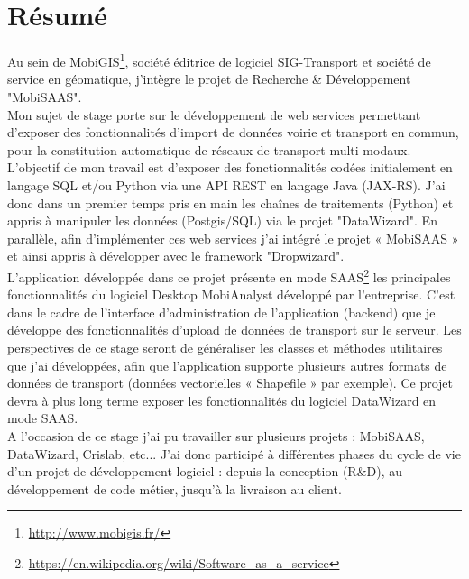 \documentclass[12pt,openany]{StyleBertrand}
\author{Bertrand Guerrero}
\begin{document}
\chapter*{Résumé}\label{Resume}

Au sein de MobiGIS\footnote{\url{http://www.mobigis.fr/}}, société éditrice de logiciel SIG-Transport et société de service en géomatique, j'intègre le projet de Recherche \& Développement "MobiSAAS".\\

Mon sujet de stage porte sur le développement de web services permettant d'exposer des fonctionnalités d'import de données voirie et transport en commun, pour la constitution automatique de réseaux de transport multi-modaux. \\

L'objectif de mon travail est d'exposer des fonctionnalités codées initialement en langage SQL et/ou Python via une API REST en langage Java (JAX-RS). J'ai donc dans un premier temps pris en main les chaînes de traitements (Python) et appris à manipuler les données (Postgis/SQL) via le projet "DataWizard". En parallèle, afin d'implémenter ces web services j'ai intégré le projet « MobiSAAS » et ainsi appris à développer avec le framework "Dropwizard". \\

L'application développée dans ce projet présente en mode SAAS\footnote{\url{https://en.wikipedia.org/wiki/Software_as_a_service}} les principales fonctionnalités du logiciel Desktop MobiAnalyst développé par l'entreprise. C'est dans le cadre de l'interface d'administration de l'application (backend) que je développe des fonctionnalités d'upload de données de transport sur le serveur. Les perspectives de ce stage seront de généraliser les classes et méthodes utilitaires que j'ai développées, afin que l'application supporte plusieurs autres formats de données de transport (données vectorielles « Shapefile » par exemple). Ce projet devra à plus long terme exposer les fonctionnalités du logiciel DataWizard en mode SAAS.\\

A l'occasion de ce stage j'ai pu travailler sur plusieurs projets : MobiSAAS, DataWizard,  Crislab, etc... J'ai donc participé à différentes phases du cycle de vie d'un projet de développement logiciel : depuis la conception (R\&D), au développement de code métier, jusqu'à la livraison au client.\\
\end{document}
